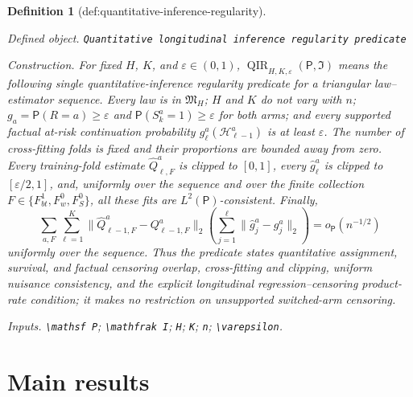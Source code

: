 \documentclass{article}
\newtheorem{definition}{Definition}
\begin{document}
\begin{definition}[def:quantitative-inference-regularity]\label{def:quantitative-inference-regularity}
\par\smallskip\noindent\emph{Defined object.} \texttt{Quantitative longitudinal inference regularity predicate}
\par\smallskip\noindent\emph{Construction.} For fixed \(H\), \(K\), and \(\varepsilon\in(0,1)\), \(\operatorname{QIR}_{H,K,\varepsilon}(\mathsf P,\mathfrak I)\) means the following single quantitative-inference regularity predicate for a triangular law--estimator sequence.  Every law is in \(\mathfrak M_H\); \(H\) and \(K\) do not vary with \(n\); \(g_a=\mathsf P(R=a)\ge\varepsilon\) and \(\mathsf P(S_k^a=1)\ge\varepsilon\) for both arms; and every supported factual at-risk continuation probability \(g_\ell^a(\mathcal H_{\ell-1}^a)\) is at least \(\varepsilon\).  The number of cross-fitting folds is fixed and their proportions are bounded away from zero.  Every training-fold estimate \(\widehat Q_{\ell,F}^a\) is clipped to \([0,1]\), every \(\widehat g_\ell^a\) is clipped to \([\varepsilon/2,1]\), and, uniformly over the sequence and over the finite collection \(F\in\{F_{bt}^1,F_w^0,F_S^0\}\), all these fits are \(L^2(\mathsf P)\)-consistent.  Finally,
\[
 \sum_{a,F}\sum_{\ell=1}^{K}
 \lVert\widehat Q_{\ell-1,F}^a-Q_{\ell-1,F}^a\rVert_2
 \left(\sum_{j=1}^{\ell}
 \lVert\widehat g_j^a-g_j^a\rVert_2\right)
 =o_{\mathsf P}(n^{-1/2})                                \tag{1}
\]
uniformly over the sequence.  Thus the predicate states quantitative assignment, survival, and factual censoring overlap, cross-fitting and clipping, uniform nuisance consistency, and the explicit longitudinal regression--censoring product-rate condition; it makes no restriction on unsupported switched-arm censoring.
\par\smallskip\noindent\emph{Inputs.} \texttt{\textbackslash{}\allowbreak{}mathsf P}; \texttt{\textbackslash{}\allowbreak{}mathfrak I}; \texttt{H}; \texttt{K}; \texttt{n}; \texttt{\textbackslash{}\allowbreak{}varepsilon}.
\end{definition}

\section{Main results}
\end{document}
